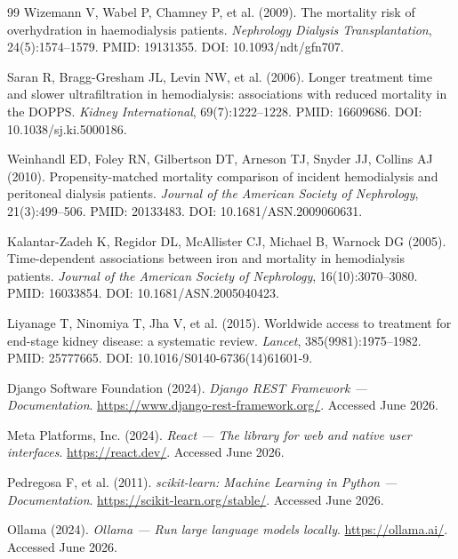 \documentclass[12pt,a4paper,twoside]{report}
\begin{document}
\begin{thebibliography}{99}
Wizemann V, Wabel P, Chamney P, et al. (2009).
\newblock The mortality risk of overhydration in haemodialysis patients.
\newblock \textit{Nephrology Dialysis Transplantation}, 24(5):1574--1579.
\newblock PMID: 19131355. DOI: 10.1093/ndt/gfn707.

Saran R, Bragg-Gresham JL, Levin NW, et al. (2006).
\newblock Longer treatment time and slower ultrafiltration in hemodialysis:
  associations with reduced mortality in the DOPPS.
\newblock \textit{Kidney International}, 69(7):1222--1228.
\newblock PMID: 16609686. DOI: 10.1038/sj.ki.5000186.

Weinhandl ED, Foley RN, Gilbertson DT, Arneson TJ, Snyder JJ, Collins AJ
  (2010).
\newblock Propensity-matched mortality comparison of incident hemodialysis and
  peritoneal dialysis patients.
\newblock \textit{Journal of the American Society of Nephrology},
  21(3):499--506.
\newblock PMID: 20133483. DOI: 10.1681/ASN.2009060631.

Kalantar-Zadeh K, Regidor DL, McAllister CJ, Michael B, Warnock DG (2005).
\newblock Time-dependent associations between iron and mortality in
  hemodialysis patients.
\newblock \textit{Journal of the American Society of Nephrology},
  16(10):3070--3080.
\newblock PMID: 16033854. DOI: 10.1681/ASN.2005040423.

Liyanage T, Ninomiya T, Jha V, et al. (2015).
\newblock Worldwide access to treatment for end-stage kidney disease: a
  systematic review.
\newblock \textit{Lancet}, 385(9981):1975--1982.
\newblock PMID: 25777665. DOI: 10.1016/S0140-6736(14)61601-9.


Django Software Foundation (2024).
\newblock \textit{Django REST Framework --- Documentation}.
\newblock \url{https://www.django-rest-framework.org/}. Accessed June 2026.

Meta Platforms, Inc. (2024).
\newblock \textit{React --- The library for web and native user interfaces}.
\newblock \url{https://react.dev/}. Accessed June 2026.

Pedregosa F, et al. (2011).
\newblock \textit{scikit-learn: Machine Learning in Python --- Documentation}.
\newblock \url{https://scikit-learn.org/stable/}. Accessed June 2026.

Ollama (2024).
\newblock \textit{Ollama --- Run large language models locally}.
\newblock \url{https://ollama.ai/}. Accessed June 2026.


\end{thebibliography}
\end{document}
